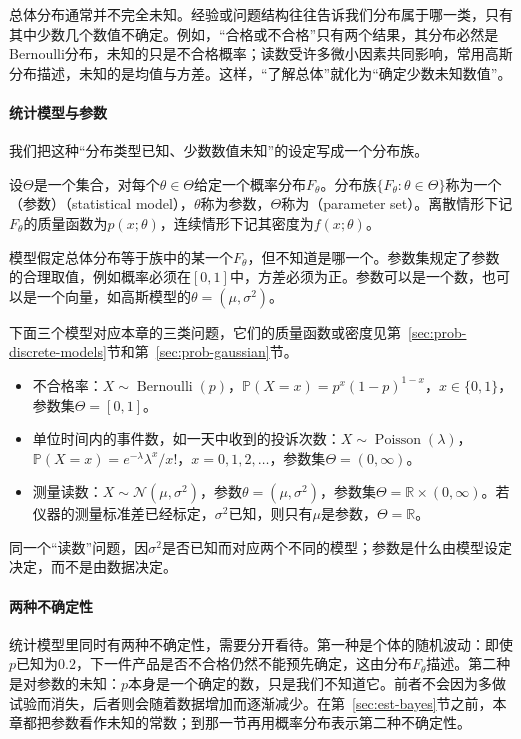 总体分布通常并不完全未知。经验或问题结构往往告诉我们分布属于哪一类，只有其中少数几个数值不确定。例如，“合格或不合格”只有两个结果，其分布必然是Bernoulli分布，未知的只是不合格概率；读数受许多微小因素共同影响，常用高斯分布描述，未知的是均值与方差。这样，“了解总体”就化为“确定少数未知数值”。

\paragraph{统计模型与参数}
我们把这种“分布类型已知、少数数值未知”的设定写成一个分布族。

\begin{definition}[统计模型与参数]
\label{def:est-statistical-model}
设$\Theta$是一个集合，对每个$\theta\in\Theta$给定一个概率分布$F_\theta$。分布族$\{F_\theta:\theta\in\Theta\}$称为一个（参数）（statistical model），$\theta$称为参数，$\Theta$称为（parameter set）。离散情形下记$F_\theta$的质量函数为$p(x;\theta)$，连续情形下记其密度为$f(x;\theta)$。
\end{definition}

模型假定总体分布等于族中的某一个$F_{\theta}$，但不知道是哪一个。参数集规定了参数的合理取值，例如概率必须在$[0,1]$中，方差必须为正。参数可以是一个数，也可以是一个向量，如高斯模型的$\theta=(\mu,\sigma^2)$。

\begin{example}[三个常用模型]
\label{ex:est-three-models}
下面三个模型对应本章的三类问题，它们的质量函数或密度见第~\ref{sec:prob-discrete-models}节和第~\ref{sec:prob-gaussian}节。
\begin{itemize}
  \item 不合格率：$X\sim\operatorname{Bernoulli}(p)$，$\mathbb{P}(X=x)=p^x(1-p)^{1-x}$，$x\in\{0,1\}$，参数集$\Theta=[0,1]$。
  \item 单位时间内的事件数，如一天中收到的投诉次数：$X\sim\operatorname{Poisson}(\lambda)$，$\mathbb{P}(X=x)=e^{-\lambda}\lambda^x/x!$，$x=0,1,2,\dots$，参数集$\Theta=(0,\infty)$。
  \item 测量读数：$X\sim\mathcal{N}(\mu,\sigma^2)$，参数$\theta=(\mu,\sigma^2)$，参数集$\Theta=\mathbb{R}\times(0,\infty)$。若仪器的测量标准差已经标定，$\sigma^2$已知，则只有$\mu$是参数，$\Theta=\mathbb{R}$。
\end{itemize}
同一个“读数”问题，因$\sigma^2$是否已知而对应两个不同的模型；参数是什么由模型设定决定，而不是由数据决定。
\end{example}

\paragraph{两种不确定性}
统计模型里同时有两种不确定性，需要分开看待。第一种是个体的随机波动：即使$p$已知为$0.2$，下一件产品是否不合格仍然不能预先确定，这由分布$F_\theta$描述。第二种是对参数的未知：$p$本身是一个确定的数，只是我们不知道它。前者不会因为多做试验而消失，后者则会随着数据增加而逐渐减少。在第~\ref{sec:est-bayes}节之前，本章都把参数看作未知的常数；到那一节再用概率分布表示第二种不确定性。

